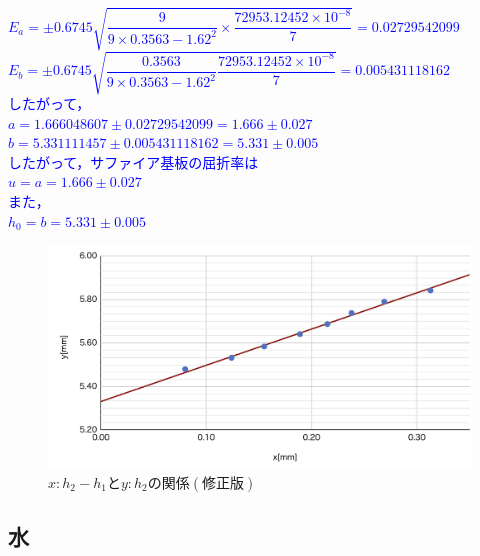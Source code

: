 \documentclass[a4paper,1pt]{jsarticle}
\newcommand{\blue}[1]{\textcolor{blue}{#1}}
\begin{document}
\blue{$E_a=\pm0.6745\sqrt{\dfrac{9}{9\times0.3563-1.62^2}\times\dfrac{72953.12452\times10^{-8}}{7}}=0.02729542099$}\\

\blue{$E_b=\pm0.6745\sqrt{\dfrac{0.3563}{9\times0.3563-1.62^2}\dfrac{72953.12452\times10^{-8}}{7}}=0.005431118162$}\\

\blue{したがって，}\\

\blue{$a=1.666048607\pm0.02729542099=1.666\pm0.027$}\\

\blue{$b=5.331111457\pm0.005431118162=5.331\pm0.005$}\\

\blue{したがって，サファイア基板の屈折率は}\\

\blue{$u=a=1.666\pm0.027$}\\

\blue{また，}\\

\blue{$h_0=b=5.331\pm0.005$}\\

\begin{figure}[h]
  \begin{center}
  \includegraphics[width=150mm]{actD.png}
  \caption{$x:h_2-h_1とy:h_2の関係(修正版)$}
  \end{center}
\end{figure}


\clearpage

\subsection[short]{水}
\end{document}
